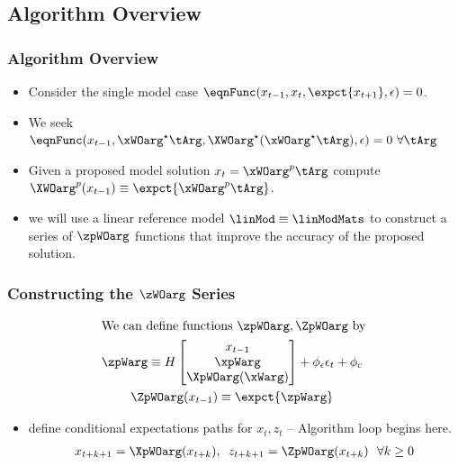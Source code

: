 \documentclass[notheorems]{beamer}
\begin{document}
\subsection{Algorithm Overview}
\label{sec:pseudocode}
\begin{frame}
  \frametitle{Algorithm Overview}
{\small
  \begin{itemize}
  \item Consider the single model case $  \eqnFunc(x_{t-1},x_t,\expct{x_{t+1}},\epsilon)=0$.  
\item We seek $\eqnFunc(x_{t-1},\xWOarg^\star\tArg,\XWOarg^\star(\xWOarg^\star\tArg),\epsilon)=0\,\,\forall \tArg $
\item Given a proposed model solution $x_t=\xWOarg^p\tArg$ compute $\XWOarg^p(x_{t-1})\equiv \expct{\xWOarg^p\tArg}$. 
\item we will use a linear reference model $\linMod  \equiv \linModMats$ 
to construct a series of $\zpWOarg$ functions that improve the accuracy of the proposed solution.
\end{itemize}
}
\end{frame}
\begin{frame}
  \frametitle{Constructing the $\zWOarg$ Series}

\begin{gather*}
 \intertext{We can define functions $\zpWOarg,\ZpWOarg$ by}
\zpWarg\equiv H
\begin{bmatrix}
x_{t-1}\\ \xpWarg\\ \XpWOarg(\xWarg)
\end{bmatrix}+\phi_\epsilon \epsilon_t+\phi_c\\
\ZpWOarg(x_{t-1})\equiv \expct{\zpWarg}
\end{gather*}
 \begin{itemize}
\item  define conditional expectations paths for $x_t, z_t$ -- {\color{green} Algorithm loop begins here.}
 \begin{gather*}
 x_{t+k+1}=\XpWOarg(x_{t+k}),\,\,\,z_{t+k+1}=\ZpWOarg(x_{t+k})\,\,\,\,  \forall k\ge 0      \end{gather*}
   \end{itemize}

\end{frame}
\end{document}
